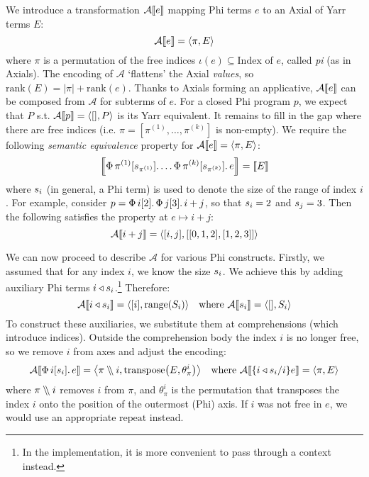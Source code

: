 We introduce a transformation $\mathcal A \denot{e}$ mapping Phi terms $e$ to an Axial of Yarr terms $E$:
$$ \mathcal A \denot{e} = \langle \pi, E \rangle $$
where $\pi$ is a permutation of the free indices $\iota(e) \subseteq \mathrm{Index}$ of $e$, called \textit{pi} (as in Axials). The encoding of $\mathcal A$ `flattens' the Axial \textit{values}, so $\mathrm{rank}(E) = |\pi| + \mathrm{rank}(e)$. Thanks to Axials forming an applicative, $\mathcal A \denot{e}$ can be composed from $\mathcal A$ for subterms of $e$. 
For a closed Phi program $p$, we expect that $P$ s.t. $\mathcal A \denot{p} = \phipair{[]}{P}$ is its Yarr equivalent. It remains to fill in the gap where there are free indices (i.e. $\pi = \left[ \pi^{(1)}, \dots, \pi^{(k)} \right]$ is non-empty). We require the following \textit{semantic equivalence} property for $\mathcal A \denot e = \phipair{\pi}{E}$:
$$ \denot{\phivec{\pi^{(1)}}{\sizeat{\pi^{(1)}}}{\dots \phivec{\pi^{(k)}}{\sizeat{\pi^{(k)}}}{e}}} = \denot{E}$$
where $s_{i}$ (in general, a Phi term) is used to denote the size of the range of index $i$. For example, consider $p = \Phi\, {i}[{2}] \ldotp {\Phi\, {j}[{3}] \ldotp {i + j}}$, so that $s_{i} = 2$ and $s_{j} = 3$. Then the following satisfies the property at $e \mapsto i + j$:
$$ \mathcal A \denot{i + j} = \phipair{[i, j]}{[[0, 1, 2], [1, 2, 3]]} $$

\newcommand{\sized}[1]{{#1} \triangleleft \sizeat{#1}}
We can now proceed to describe $\mathcal A$ for various Phi constructs. Firstly, we assumed that for any index $i$, we know the size $s_{i}$. We achieve this by adding auxiliary Phi terms $\sized i$.\footnote{In the implementation, it is more convenient to pass through a context instead.} Therefore:
$$ \mathcal A \denot{i \triangleleft \sizeat{i}} 
= \phipair{[i]}{ \mathrm{range} \left( \altsizeat{i} \right) }
\quad 
\text{where } \mathcal A \denot{\sizeat{i}} = \phipair{[]}{\altsizeat{i}} $$
To construct these auxiliaries, we substitute them at comprehensions (which introduce indices). Outside the comprehension body the index $i$ is no longer free, so we  remove $i$ from axes and adjust the encoding:
\newcommand{\dblsetminus}{\mathbin{{\setminus}\mspace{-5mu}{\setminus}}}
$$
\mathcal A \denot{\phivec{i}{\sizeat i}{e}} 
= \phipair{\mathcal \pi \dblsetminus i}{
\mathrm{transpose} \left( E, \theta_\pi^i \right)} 
\quad
\text{where } \mathcal A \denot{\{\sized i / i\} e} 
= \phipair{\pi}{E}
$$
where $\pi \dblsetminus i$ removes $i$ from $\pi$, and $\theta_\pi^i$ is the permutation that transposes the index $i$ onto the position of the outermost (Phi) axis. 
If $i$ was not free in $e$, we would use an appropriate $\mathrm{repeat}$ instead.

